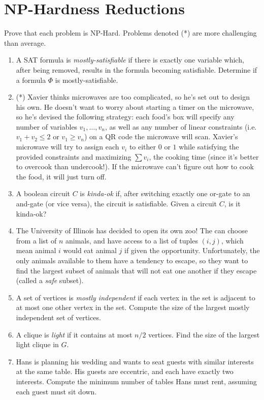 \documentclass[fleqn]{article}
\begin{document}
\section{NP-Hardness Reductions}
Prove that each problem is NP-Hard. Problems denoted (*) are more challenging than average.
\begin{enumerate}
    \item A SAT formula is \textit{mostly-satisfiable} if there is exactly one variable which, after being removed, results in the formula becoming satisfiable. Determine if a formula $\Phi$ is mostly-satisfiable.
    \item (*) Xavier thinks microwaves are too complicated, so he's set out to design his own. He doesn't want to worry about starting a timer on the microwave, so he's devised the following strategy: each food's box will specify any number of variables $v_1, \dots, v_n$, as well as any number of linear constraints (i.e. $v_1 + v_2 \le 2$ or $v_1 \geq v_n$) on a QR code the microwave will scan. Xavier's microwave will try to assign each $v_i$ to either $0$ or $1$ while satisfying the provided constraints and maximizing $\sum v_i$, the cooking time (since it's better to overcook than undercook!). If the microwave can't figure out how to cook the food, it will just turn off.
    \item A boolean circuit $C$ is \textit{kinda-ok} if, after switching exactly one or-gate to an and-gate (or vice versa), the circuit is satisfiable. Given a circuit $C$, is it kinda-ok?
    \item The University of Illinois has decided to open its own zoo! The can choose from a list of $n$ animals, and have access to a list of tuples $(i,j)$, which mean animal $i$ would eat animal $j$ if given the opportunity. Unfortunately, the only animals available to them have a tendency to escape, so they want to find the largest subset of animals that will not eat one another if they escape (called a \textit{safe} subset).
    \item A set of vertices is \textit{mostly independent} if each vertex in the set is adjacent to at most one other vertex in the set. Compute the size of the largest mostly independent set of vertices.
    \item A clique is \textit{light} if it contains at most $n/2$ vertices. Find the size of the largest light clique in $G$.
    \item Hans is planning his wedding and wants to seat guests with similar interests at the same table. His guests are eccentric, and each have exactly two interests. Compute the minimum number of tables Hans must rent, assuming each guest must sit down.

\end{enumerate}
\end{document}
